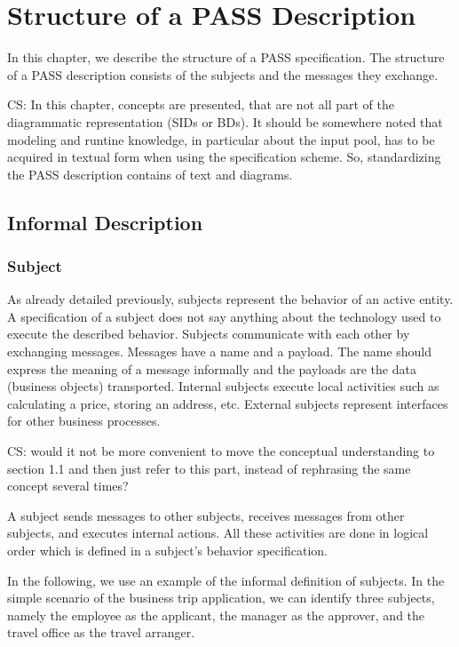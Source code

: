 
\chapter{Structure of a PASS Description}
\label{PASSStruct}

In this chapter, we describe the structure of a PASS specification. The structure of a PASS description consists of the subjects and the messages they exchange.

CS: In this chapter, concepts are presented, that are not all part of the diagrammatic representation (SIDs or BDs). It should be somewhere noted that modeling and runtine knowledge, in particular about the input pool, has to be acquired in textual form when using the specification scheme. So, standardizing the PASS description contains of text and diagrams.

\section{Informal Description}
\subsection{Subject}
\label{sec: Subject}

As already detailed previously, subjects represent the behavior of an active entity. A specification of a subject does not say anything about the technology used to execute the described behavior. Subjects communicate with each other by exchanging messages. Messages have a name and a payload. The name should express the meaning of a message informally and the payloads are the data (business objects) transported. Internal subjects execute local activities such as calculating a price, storing an address, etc. External subjects represent interfaces for other business processes.

CS: would it not be more convenient to move the conceptual understanding to section 1.1 and then just refer to this part, instead of rephrasing the same concept several times?

A subject sends messages to other subjects, receives messages from other subjects, and executes internal actions. All these activities are done in logical order which is defined in a subject's behavior specification.

In the following, we use an example of the informal definition of subjects. In the simple scenario of the business trip application, we can identify three subjects, namely the employee as the applicant, the manager as the approver, and the travel office as the travel arranger.

